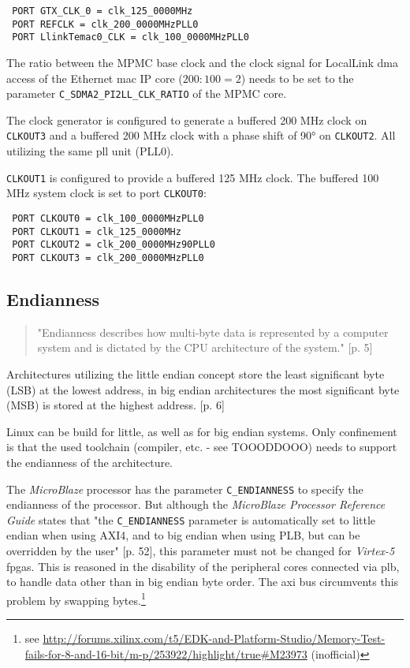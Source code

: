\begin{verbatim}
 PORT GTX_CLK_0 = clk_125_0000MHz
 PORT REFCLK = clk_200_0000MHzPLL0
 PORT LlinkTemac0_CLK = clk_100_0000MHzPLL0
\end{verbatim}

The ratio between the MPMC base clock and the clock signal for LocalLink \gls{dma} access of the Ethernet \gls{mac} IP core ($200:100 = 2$) needs to be set to the parameter \texttt{C\_SDMA2\_PI2LL\_CLK\_RATIO} of the MPMC core.

The clock generator is configured to generate a buffered 200 MHz clock on \texttt{CLKOUT3} and a buffered 200 MHz clock with a phase shift of 90° on \texttt{CLKOUT2}. All utilizing the same \gls{pll} unit (PLL0).

\texttt{CLKOUT1} is configured to provide a buffered 125 MHz clock. The buffered 100 MHz system clock is set to port \texttt{CLKOUT0}:

\begin{verbatim}
 PORT CLKOUT0 = clk_100_0000MHzPLL0
 PORT CLKOUT1 = clk_125_0000MHz
 PORT CLKOUT2 = clk_200_0000MHz90PLL0
 PORT CLKOUT3 = clk_200_0000MHzPLL0
\end{verbatim}


\subsection{Endianness}

\begin{quote}
 "Endianness describes how multi-byte data is represented by a computer system and is dictated by the CPU architecture of the system." \cite{intel_endiannness}[p. 5]
\end{quote}

Architectures utilizing the little endian concept store the least significant byte (LSB) at the lowest address, in big endian architectures the most significant byte (MSB) is stored at the highest address. \cite{intel_endiannness}[p. 6]

Linux can be build for little, as well as for big endian systems. Only confinement is that the used toolchain (compiler, etc. - see TOOODDOOO) needs to support the endianness of the architecture.

The \textit{MicroBlaze} processor has the parameter \texttt{C\_ENDIANNESS} to specify the endianness of the processor. But although the \textit{MicroBlaze Processor Reference Guide} states that "the \texttt{C\_ENDIANNESS} parameter is automatically set to little endian when using AXI4, and to big endian when using PLB, but can be overridden by the user" \cite{mb_ref}[p. 52], this parameter must not be changed for \textit{Virtex-5} \gls{fpga}s. This is reasoned in the disability of the peripheral cores connected via \gls{plb}, to handle data other than in big endian byte order. The \gls{axi} bus circumvents this problem by swapping bytes.\footnote{see \url{http://forums.xilinx.com/t5/EDK-and-Platform-Studio/Memory-Test-fails-for-8-and-16-bit/m-p/253922/highlight/true\#M23973} (inofficial)}


